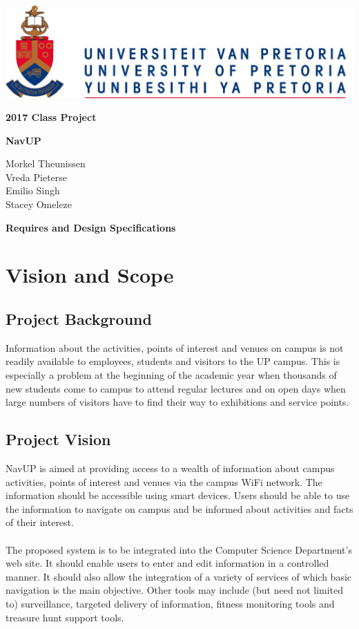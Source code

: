\documentclass[12pt]{article}
\begin{document}
\begin{titlepage}
\begin{center}
\includegraphics[scale=1]{diagrams/up.png}
\\
\begin{huge}
\textbf{2017 Class Project}

\textbf{NavUP}\\
\end{huge}
\begin{small}
Morkel Theunissen\\
Vreda Pieterse\\
Emilio Singh\\
Stacey Omeleze\\ 

\end{small}
\begin{huge}
\textbf{Requires and Design Specifications}
\end{huge}

\end{center}
\end{titlepage}

\section{Vision and Scope}
\subsection{Project Background}
Information about the activities, points of interest and venues on campus is not readily available to employees, students and visitors to the UP campus. This is especially a problem at the beginning of the academic year when thousands of new students come to campus to attend regular lectures and on open days when large numbers of visitors have to find their way to exhibitions and service points.
\subsection{Project Vision}
NavUP is aimed at providing access to a wealth of information about campus activities, points of interest and venues via the campus WiFi network. The information should be accessible using smart devices.  Users should be able to use the information to navigate on campus and be informed about activities and facts of their interest. 
\\
\\
The proposed system is to be integrated into the Computer Science Department's web site. It should enable users to enter and edit information in a controlled manner. It should also allow the integration of a variety of services of which basic navigation is the main objective. Other tools may include (but need not limited to) surveillance, targeted delivery of information, fitness monitoring tools and treasure hunt support tools.
\end{document}
